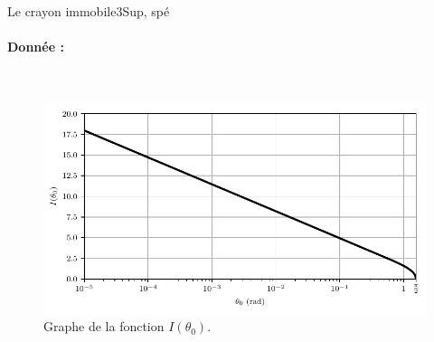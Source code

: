 \begin{exercise}{Le crayon immobile}{3}{Sup, spé}
\paragraph{Donnée :}~\vspace{-3em}\\
\begin{figure}[H]
    \centering
    \includegraphics[scale=1]{meca/fonction_Ilog.pdf}
    \vspace{-1em}
    \caption{Graphe de la fonction $I(\theta_0)$.}
    \end{figure}
\end{exercise}